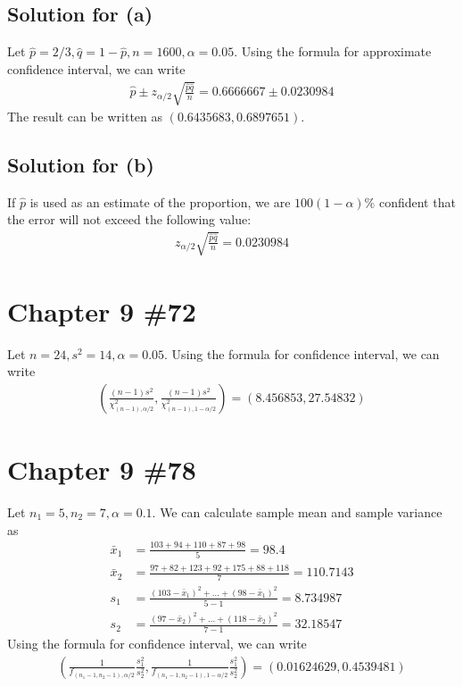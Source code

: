 \documentclass{scrartcl}
\begin{document}
\subsection{Solution for (a)}
Let \(\hat{p} = 2 / 3, \hat{q} = 1 - \hat{p}, n = 1600, \alpha = 0.05\). Using
the formula for approximate confidence interval, we can write
\begin{align*}
  \hat{p} \pm z_{\alpha / 2} \sqrt{\frac{\hat{p} \hat{q}}{n}}
  = 0.6666667 \pm 0.0230984
\end{align*}
The result can be written as \((0.6435683, 0.6897651)\).

\subsection{Solution for (b)}
If \(\hat{p}\) is used as an estimate of the proportion, we are \(100(1 -
\alpha)\%\) confident that the error will not exceed the following value:
\begin{align*}
  z_{\alpha / 2} \sqrt{\frac{\hat{p} \hat{q}}{n}}
  = 0.0230984
\end{align*}

\section{Chapter 9 \#72}
Let \(n = 24, s^2 = 14, \alpha = 0.05\). Using the formula for confidence
interval, we can write
\begin{align*}
  \left( \frac{(n - 1) s^2}{\chi^2_{(n - 1), \alpha / 2}},
    \frac{(n - 1) s^2}{\chi^2_{(n - 1), 1 - \alpha / 2}} \right)
  = (8.456853, 27.54832)
\end{align*}

\section{Chapter 9 \#78}
Let \(n_1 = 5, n_2 = 7, \alpha = 0.1\). We can calculate sample mean and sample
variance as
\begin{align*}
  \bar{x}_1
  &= \frac{103 + 94 + 110 + 87 + 98}{5}
  = 98.4 \\
  \bar{x}_2
  &= \frac{97 + 82 + 123 + 92 + 175 + 88 + 118}{7}
  = 110.7143 \\
  s_1
  &= \frac{(103 - \bar{x}_1)^2 + \dots + (98 - \bar{x}_1)^2}{5 - 1}
  = 8.734987 \\
  s_2
  &= \frac{(97 - \bar{x}_2)^2 + \dots + (118 - \bar{x}_2)^2}{7 - 1}
  = 32.18547
\end{align*}
Using the formula for confidence interval, we can write
\begin{align*}
  \left( \frac{1}{f_{(n_1 - 1, n_2 - 1), \alpha / 2}}
    \frac{s^2_1}{s^2_2},
    \frac{1}{f_{(n_1 - 1, n_2 - 1), 1 - \alpha / 2}}
    \frac{s^2_1}{s^2_2} \right)
  = (0.01624629, 0.4539481)
\end{align*}
\end{document}
